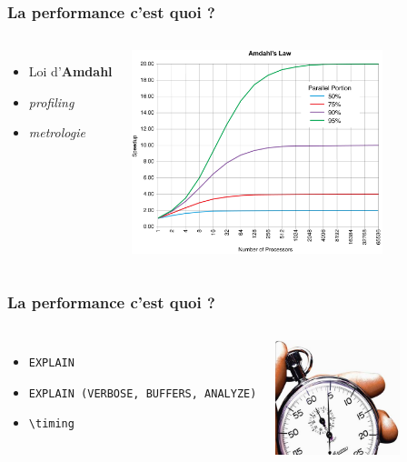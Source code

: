 \documentclass{beamer}
\begin{document}
\begin{frame}
  \frametitle{La performance c'est quoi ?}

  \vfill

\begin{columns}[c]

  \begin{itemize}
  \item Loi d'\textbf{Amdahl}
  \item \textit{profiling}
  \item \textit{metrologie}
  \end{itemize}

\begin{center}
  \includegraphics[height=16em]{amdahlslaw.png}
\end{center}
\end{columns}
\end{frame}

\begin{frame}
  \frametitle{La performance c'est quoi ?}

  \vfill

\begin{columns}[c]

  \begin{itemize}
  \item \texttt{EXPLAIN}
  \item \texttt{EXPLAIN (VERBOSE, BUFFERS, ANALYZE)}
  \item \texttt{{\textbackslash}timing}
  \end{itemize}

\begin{center}
  \includegraphics[height=9em]{timing.jpg}
\end{center}
\end{columns}
\end{frame}
\end{document}
